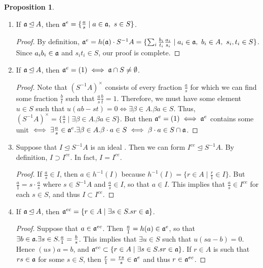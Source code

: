 \documentclass[10pt,letterpaper,cm]{nupset}
\theoremstyle{definition}
\newtheorem{prop}{Proposition}
\newcommand{\1}{\mathbf{1}}
\newcommand{\0}{\vec 0}
\begin{document}
\begin{prop} $ $
\begin{enumerate}
\item If $\frak{a} \unlhd A$, then $\frak{a}^e = \{\frac{a}{s} \mid a\in \frak{a}, \ s \in S\}$.
\begin{proof}
By definition, $\frak{a}^e = h(\frak{a}) \cdot S^{-1}A = \{ \sum_{i} \frac{b_i}{t_i}\frac{a_i}{s_i} \mid a_i \in \frak{a}, \ b_i \in A, \ s_i, t_i \in S\}$. Since $a_ib_i \in \frak{a}$ and $s_it_i \in S$, our proof is complete.
\end{proof}
\item If $\frak{a} \unlhd A$, then $\frak{a}^e = (1) \iff \frak{a} \cap S \ne \emptyset$. 
\begin{proof}
Note that $(S^{-1}A)^{\times}$ consists of every fraction $\frac{a}{s}$ for which we can find some fraction $\frac{b}{t}$ such that $\frac{a}{s}\frac{b}{t} =1$. Therefore, we must have some element $u\in S$ such that $u(ab-st) = 0 \iff \exists \beta \in A. \beta a \in S$. Thus, $(S^{-1}A)^{\times} = \{\frac{a}{s} \mid \exists \beta \in A. \beta a \in S\}$. But then $\frak{a}^e = (1) \iff \frak{a}^e$ contains some unit $\iff \exists \frac{a}{s} \in \frak{a}^e. \exists \beta \in A. \beta \cdot a \in S \iff \beta \cdot a \in S\cap \frak{a}$.
\end{proof}
\item Suppose that $I \unlhd S^{-1}A$ is an ideal . Then we can form $I^{ce} \unlhd S^{-1}A$. By definition, $I \supset I^{ce}$. In fact, $I = I^{ce}$.  
\begin{proof}
If $\frac{a}{s} \in I$, then $a\in h^{-1}(I)$ because $h^{-1}(I) = \{ r\in A \mid \frac{r}{1}\in I \}$. But $\frac{a}{1}  = s\cdot \frac{a}{s}$ where $s\in S^{-1}A$ and $\frac{a}{s} \in I$, so that $a\in I$. This implies that $\frac{a}{s} \in I^{ ce}$ for each $s\in S$, and thus $I\subset I^{ce}$. 
\end{proof}
\item If $\frak{a} \unlhd A$, then $\frak{a}^{ec} = \{r\in A  \mid \exists s \in S. sr \in \frak{a}\}$. 
\begin{proof}
Suppose that $a\in \frak{a}^{ec}$. Then $\frac{a}{1} = h(a) \in  \frak{a}^e$, so that $\exists b \in \frak{a}.\exists s \in S. \frac{a}{1} = \frac{b}{s}$. This implies that $\exists u \in S$ such that $u(sa - b) =0$. Hence $(us)a = b$, and $\frak{a}^{ec} \subset \{r\in A  \mid \exists s \in S. sr \in \frak{a}\}$.  If $r\in A$ is such that $rs \in \frak{a}$ for some $s\in S$, then $\frac{r}{1} = \frac{rs}{s} \in \frak{a}^e$ and thus $r \in \frak{a}^{ec}$. 

\end{proof}
\end{enumerate}
\end{prop}
\end{document}
